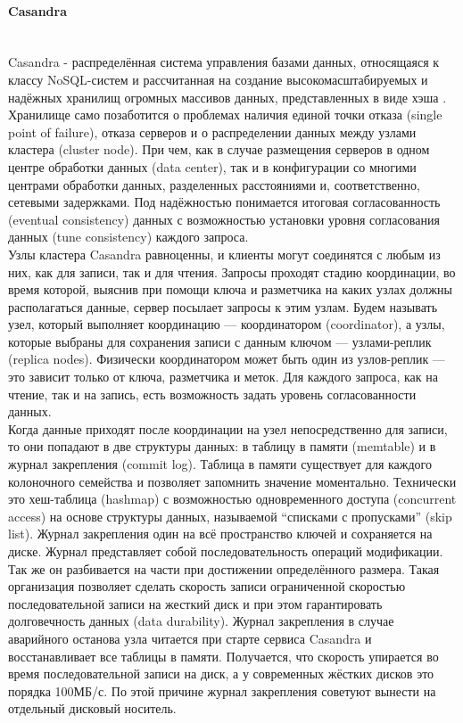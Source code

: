 \paragraph{Casandra}~\\
Casandra - распределённая система управления базами данных, относящаяся к классу NoSQL-систем и рассчитанная на создание высокомасштабируемых и надёжных хранилищ огромных массивов данных, представленных в виде хэша \autocite{casandra}. \\
Хранилище само позаботится о проблемах наличия единой точки отказа (single point of failure), отказа серверов и о распределении данных между узлами кластера (cluster node). При чем, как в случае размещения серверов в одном центре обработки данных (data center), так и в конфигурации со многими центрами обработки данных, разделенных расстояниями и, соответственно, сетевыми задержками. Под надёжностью понимается итоговая согласованность (eventual consistency) данных с возможностью установки уровня согласования данных (tune consistency) каждого запроса. \\
Узлы кластера Casandra равноценны, и клиенты могут соединятся с любым из них, как для записи, так и для чтения. Запросы проходят стадию координации, во время которой, выяснив при помощи ключа и разметчика на каких узлах должны располагаться данные, сервер посылает запросы к этим узлам. Будем называть узел, который выполняет координацию — координатором (coordinator), а узлы, которые выбраны для сохранения записи с данным ключом — узлами-реплик (replica nodes). Физически координатором может быть один из узлов-реплик — это зависит только от ключа, разметчика и меток.
Для каждого запроса, как на чтение, так и на запись, есть возможность задать уровень согласованности данных. \\
Когда данные приходят после координации на узел непосредственно для записи, то они попадают в две структуры данных: в таблицу в памяти (memtable) и в журнал закрепления (commit log). Таблица в памяти существует для каждого колоночного семейства и позволяет запомнить значение моментально. Технически это хеш-таблица (hashmap) с возможностью одновременного доступа (concurrent access) на основе структуры данных, называемой “списками с пропусками” (skip list). Журнал закрепления один на всё пространство ключей и сохраняется на диске. Журнал представляет собой последовательность операций модификации. Так же он разбивается на части при достижении определённого размера.
Такая организация позволяет сделать скорость записи ограниченной скоростью последовательной записи на жесткий диск и при этом гарантировать долговечность данных (data durability). Журнал закрепления в случае аварийного останова узла читается при старте сервиса Casandra и восстанавливает все таблицы в памяти. Получается, что скорость упирается во время последовательной записи на диск, а у современных жёстких дисков это порядка 100МБ/с. По этой причине журнал закрепления советуют вынести на отдельный дисковый носитель.

